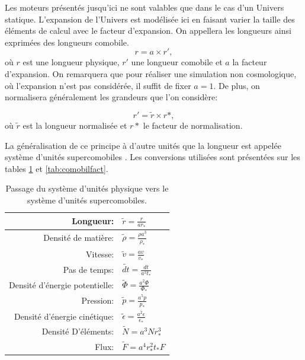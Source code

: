 Les moteurs présentés jusqu'ici ne sont valables que dans le cas d'un Univers statique.
L'expansion de l'Univers est modélisée ici en faisant varier la taille des éléments de calcul avec le facteur d'expansion.
On appellera les longueurs ainsi exprimées des longueurs comobile.
\begin{equation}
r=a \times r',
\end{equation}
où $r$ est une longueur physique, $r'$ une longueur comobile et $a$ la facteur d'expansion.
On remarquera que pour réaliser une simulation non cosmologique, où l'expansion n'est pas considérée, il suffit de fixer $a=1$.
De plus, on normalisera généralement les grandeurs que l'on considère:

\begin{equation}
r'=\tilde{r} \times r*,
\end{equation}
où $\tilde{r}$ est la longueur normalisée et $r*$ le facteur de normalisation.

La généralisation de ce principe à d'autre unités que la longueur est appelée système d'unités supercomobiles \citep{martel_convenient_1998}.
Les conversions utilisées sont présentées sur les tables \ref{tab:comobil} et \ref{tab:comobilfact}.

\begin{table}
\begin{center}
\begin{tabular}{r l} \hline 
Longueur: & $\tilde{r}=\frac{r}{ar_*}$ \\ \hline 
Densité de matière: & $\tilde{\rho}=\frac{\rho a^3}{\rho_*}$ \\ \hline 
Vitesse: & $ \tilde{v}=\frac{av}{v_*}$ \\ \hline 
Pas de temps: & $\tilde{dt}=\frac{dt}{a^2t_*}$\\ \hline 
Densité d’énergie potentielle: & $\tilde{\Phi}=\frac{a^2 \Phi}{\Phi_*}$\\ \hline 
Pression: & $\tilde{p}=\frac{a^5 p}{p_*}$\\ \hline 
Densité d’énergie cinétique: & $\tilde{\epsilon}=\frac{a^2 \epsilon}{\epsilon_*}$\\ \hline 
Densité D’éléments: & $\tilde{N}=a^3 N r_*^3$\\ \hline 
Flux: & $\tilde{F}=a^4 r_*^2 t_* F$\\ \hline 
\end{tabular} 
\end{center}
\caption[Système d'unité supercomobile]{Passage du système d'unités physique vers le système d'unités supercomobiles.
\label{tab:comobil}
} 
\end{table}


